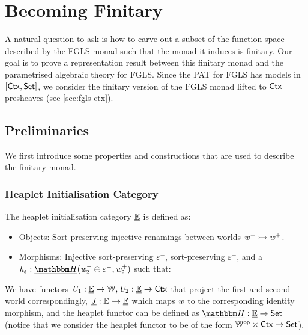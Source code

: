 
\section{Becoming Finitary}

A natural question to ask is how to carve out a subset of the function space described by the FGLS monad such that the monad it induces is finitary.
Our goal is to prove a representation result between this finitary monad and the parametrised algebraic theory for FGLS.
Since the PAT for FGLS has models in $[\mathsf{Ctx}, \mathsf{Set}]$, we consider the finitary version of the FGLS monad lifted to $\mathsf{Ctx}$ presheaves (see \cref{sec:fgls-ctx}). 

\subsection{Preliminaries}

We first introduce some properties and constructions that are used to describe the finitary monad.

\subsubsection{Heaplet Initialisation Category}
The heaplet initialisation category $\underline{\mathbb{E}}$ is defined as:
\begin{itemize}
    \item Objects: Sort-preserving injective renamings between worlds $\mathit{w}^- \rightarrowtail \mathit{w}^+$.
    \item Morphisms: Injective sort-preserving $\varepsilon^-$, sort-preserving $\varepsilon^+$, and a $\vh_\varepsilon : \dheapF(\vw_2^- \ominus \varepsilon^-, \vw_2^+)$ such that: 
                    \begin{center}
                    \end{center}
\end{itemize}
We have functors $\mathit{U}_1 : \underline{\mathbb{E}} \to \mathbb{W}, \mathit{U}_2 : \underline{\mathbb{E}} \to \mathsf{Ctx}$ that project the first and second world correspondingly, 
$\underline{\mathit{J}} : \mathbb{E} \hookrightarrow \underline{\mathbb{E}}$ which maps $\mathit{w}$ to the corresponding identity morphism, and the heaplet functor can be defined as $\dheapF : \dinitC \to \setC$ 
(notice that we consider the heaplet functor to be of the form ${\mathbb{W}}^{\mathsf{op}} \times \mathsf{Ctx} \to \mathsf{Set}$).

